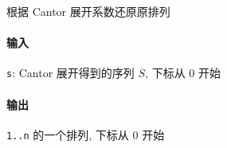 根据 Cantor 展开系数还原原排列

\paragraph{输入}

\verb|s|: Cantor 展开得到的序列 \(S\), 下标从 \(0\) 开始

\paragraph{输出}

\verb|1..n| 的一个排列, 下标从 \(0\) 开始
